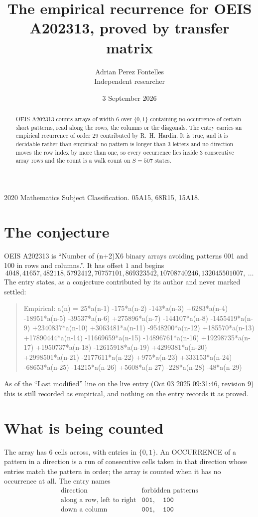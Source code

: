 \documentclass[11pt,a4paper]{article}
\title{The empirical recurrence for OEIS A202313, proved by transfer matrix}
\author{Adrian Perez Fontelles\\ \small Independent researcher}
\date{3 September 2026}
\theoremstyle{plain}
\theoremstyle{definition}
\begin{document}
\maketitle

\begin{abstract}
OEIS A202313 counts arrays of width $6$ over $\{0,1\}$ containing no occurrence of certain short
patterns, read along the rows, the columns or the diagonals. The entry carries an empirical
recurrence of order $29$ contributed by R.~H.~Hardin. It is true, and it is decidable
rather than empirical: no pattern is longer than $3$ letters and no direction moves the row
index by more than one, so every occurrence lies inside $3$ consecutive array rows and the
count is a walk count on $S=507$ states.
\end{abstract}

\noindent\small 2020 Mathematics Subject Classification. 05A15, 68R15, 15A18.\normalsize

\section{The conjecture}

OEIS A202313 is ``Number of (n+2)X6 binary arrays avoiding patterns 001 and 100 in rows and columns.''. It has offset $1$ and begins
\[
4048, 41657, 482118, 5792412, 70757101, 869323542, 10708740246, 132045501007,\ \dots
\]
The entry states, as a conjecture contributed by its author and never marked settled:
\begin{quote}
Empirical: a(n) = 25*a(n-1) -175*a(n-2) -143*a(n-3) +6283*a(n-4) -18951*a(n-5) -39537*a(n-6) +275896*a(n-7) -144107*a(n-8) -1455419*a(n-9) +2340837*a(n-10) +3063481*a(n-11) -9548200*a(n-12) +185570*a(n-13) +17890444*a(n-14) -11669659*a(n-15) -14896761*a(n-16) +19298735*a(n-17) +1950737*a(n-18) -12615918*a(n-19) +4299381*a(n-20) +2998501*a(n-21) -2177611*a(n-22) +975*a(n-23) +333153*a(n-24) -68653*a(n-25) -14215*a(n-26) +5608*a(n-27) -228*a(n-28) -48*a(n-29)
\end{quote}
As of the ``Last modified'' line on the live entry (Oct 03 2025 09:31:46, revision 9) this is still
recorded as empirical, and nothing on the entry records it as proved.

\section{What is being counted}

The array has $6$ cells across, with entries in $\{0,1\}$. An OCCURRENCE of a pattern in a
direction is a run of consecutive cells taken in that direction whose entries match the pattern
in order; the array is counted when it has no occurrence at all. The entry names
\[
\begin{array}{ll}
\text{direction} & \text{forbidden patterns} \\[2pt]
\text{along a row, left to right} & \mathtt{001},\quad \mathtt{100} \\
\text{down a column} & \mathtt{001},\quad \mathtt{100} \\
\end{array}
\]
\end{document}
